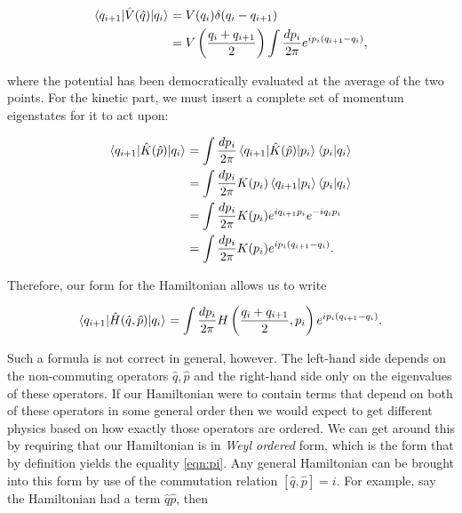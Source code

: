 \begin{equation}
\begin{split}
\mathinner{\langle q_{i+1}\vert\hat{V}(\hat{q})\vert q_i\rangle}_{} &= V(q_i) \delta(q_i - q_{i+1}) \\
&= V \left(\frac{q_i + q_{i+1}}{2} \right) \int \frac{d p_i}{2 \pi} e^{i p_i(q_{i+1} - q_i)},
\end{split}
\end{equation}

where the potential has been democratically evaluated at the average of the two points. For the kinetic part, we must insert a complete set of momentum eigenstates for it to act upon:

\begin{equation}
\begin{split}
\mathinner{\langle q_{i+1}\vert\hat{K}(\hat{p})\vert q_i\rangle}_{} & = \int \frac{dp_i}{2 \pi} \mathinner{\langle q_{i+1}\vert\hat{K}(\hat{p})\vert p_i\rangle}_{}\left<p_i|q_i \right> \\
&= \int \frac{dp_i}{2 \pi}K(p_i) \left<q_{i+1}|p_i \right> \left<p_i|q_i \right> \\
&= \int \frac{dp_i}{2 \pi}K(p_i) e^{i q_{i+1}p_i} e^{-i q_i p_i}  \\
&= \int \frac{dp_i}{2 \pi}K(p_i) e^{i p_i(q_{i+1}-q_i)}.
\end{split}
\end{equation}

Therefore, our form for the Hamiltonian allows us to write

\begin{equation}
\label{eqn:pi}
\mathinner{\langle q_{i+1}\vert\hat{H}(\hat{q}, \hat{p})\vert q_i\rangle}_{} = \int \frac{d p_i}{2 \pi} H\left(\frac{q_i + q_{i+1}}{2}, p_i \right) e^{i p_i (q_{i+1}-q_i)}.
\end{equation}

Such a formula is not correct in general, however. The left-hand side depends on the non-commuting operators $\hat{q}, \hat{p}$ and the right-hand side only on the eigenvalues of these operators. If our Hamiltonian were to contain terms that depend on both of these operators in some general order then we would expect to get different physics based on how exactly those operators are ordered. We can get around this by requiring that our Hamiltonian is in \emph{Weyl ordered} form, which is the form that by definition yields the equality \ref{eqn:pi}. Any general Hamiltonian can be brought into this form by use of the commutation relation $[\hat{q}, \hat{p}] = i$. For example, say the Hamiltonian had a term $\hat{q} \hat{p}$, then

